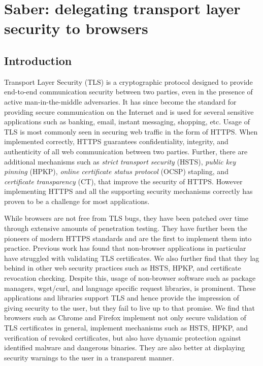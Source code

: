 \chapter{Saber: delegating transport layer security to browsers}
\label{ch:saber}

\section{Introduction}
\label{sec:intro-saber}

Transport Layer Security (TLS) is a cryptographic protocol designed to provide
end-to-end communication security between two parties, even in the presence of
active man-in-the-middle adversaries. It has since become the standard for
providing secure communication on the Internet and is used for several
sensitive applications such as banking, email, instant messaging, shopping,
etc. Usage of TLS is most commonly seen in securing web traffic in the form of
HTTPS. When implemented correctly, HTTPS guarantees confidentiality, integrity,
and authenticity of all web communication between two parties. Further, there
are additional mechanisms such as \emph{strict transport security} (HSTS),
\emph{public key pinning} (HPKP), \emph{online certificate status protocol}
(OCSP) stapling, and \emph{certificate transparency} (CT), that improve the
security of HTTPS. However implementing HTTPS and all the supporting security
mechanisms correctly has proven to be a challenge for most applications.

While browsers are not free from TLS bugs, they have been patched over time
through extensive amounts of penetration testing. They have further been the
pioneers of modern HTTPS standards and are the first to implement them into
practice. Previous work has found that non-browser applications in particular
have struggled with validating TLS certificates\cite{dangerous}. We also
further find that they lag behind in other web security practices such as HSTS,
HPKP, and certificate revocation checking. Despite this, usage of non-browser
software such as package managers, wget/curl, and language specific request
libraries, is prominent. These applications and libraries support TLS and hence
provide the impression of giving security to the user, but they fail to live up
to that promise. We find that browsers such as Chrome and Firefox implement not
only secure validation of TLS certificates in general, implement mechanisms
such as HSTS, HPKP, and verification of revoked certificates, but also have
dynamic protection against identified malware and dangerous binaries. They are
also better at displaying security warnings to the user in a transparent
manner.


